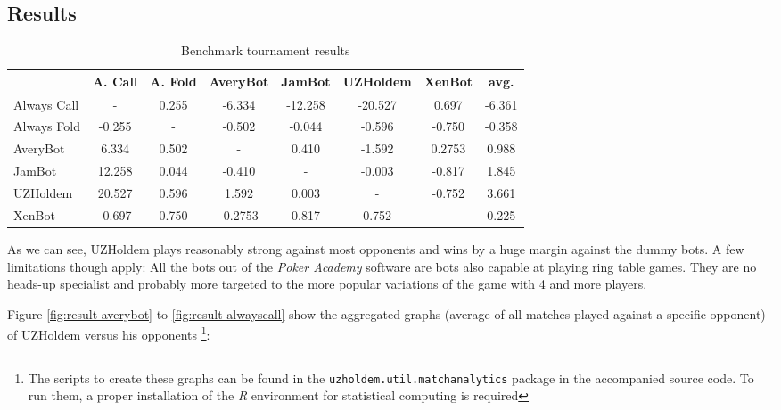 \subsection{Results} 
\begin{table}
\begin{center}
  \begin{tabular}{ l|c c c c c c|c}

& A. Call& A. Fold& AveryBot& JamBot& UZHoldem& XenBot& avg. \\
 \hline
Always Call &  - & 0.255 & -6.334 & -12.258 & -20.527 & 0.697 & -6.361 \\ 
Always Fold & -0.255 &  - & -0.502 & -0.044 & -0.596 & -0.750 & -0.358 \\ 
AveryBot & 6.334 & 0.502 &  - & 0.410 & -1.592 & 0.2753 & 0.988 \\ 
JamBot & 12.258 & 0.044 & -0.410 &  - & -0.003 & -0.817 & 1.845 \\ 
UZHoldem & 20.527 & 0.596 & 1.592 & 0.003 &  - & -0.752 & 3.661 \\ 
XenBot & -0.697 & 0.750 & -0.2753 & 0.817 & 0.752 &  - & 0.225 \\ 

 \end{tabular}
\end{center}
 
\caption{Benchmark tournament results}

\end{table}

As we can see, UZHoldem plays reasonably strong against most opponents and wins by a huge margin against the dummy bots. A few limitations though apply: All the bots out of the \textit{Poker Academy} software are bots also capable at playing ring table games. They are no heads-up specialist and probably more targeted to the more popular variations of the game with 4 and more players. 

Figure \ref{fig:result-averybot} to \ref{fig:result-alwayscall} show the aggregated graphs (average of all matches played against a specific opponent) of UZHoldem versus his opponents  \footnote{The scripts to create these graphs can be found in the \texttt{uzholdem.util.matchanalytics} package in the accompanied source code. To run them, a proper installation of the \textit{R} environment for statistical computing is required}: 


